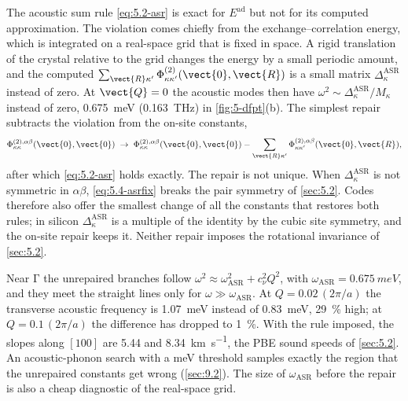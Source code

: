 The acoustic sum rule \cref{eq:5.2-asr} is exact for $E^{\mathrm{ad}}$ but not for its computed approximation. The violation comes chiefly from the exchange--correlation energy, which is integrated on a real-space grid that is fixed in space. A rigid translation of the crystal relative to the grid changes the energy by a small periodic amount, and the computed $\sum_{\vect{R}\kappa'}\Phi^{(2)}_{\kappa\kappa'}(\vect{0},\vect{R})$ is a small matrix $\Delta^{\mathrm{ASR}}_\kappa$ instead of zero. At $\vect{Q} = 0$ the acoustic modes then have $\omega^2 \sim \Delta^{\mathrm{ASR}}_\kappa/M_\kappa$ instead of zero, \SI{0.675}{meV} (\SI{0.163}{THz}) in \cref{fig:5-dfpt}(b). The simplest repair subtracts the violation from the on-site constants,
\begin{equation}
  \Phi^{(2),\alpha\beta}_{\kappa\kappa}(\vect{0},\vect{0}) \;\to\; \Phi^{(2),\alpha\beta}_{\kappa\kappa}(\vect{0},\vect{0}) - \sum_{\vect{R}\kappa'}\Phi^{(2),\alpha\beta}_{\kappa\kappa'}(\vect{0},\vect{R}) ,
  \label{eq:5.4-asrfix}
\end{equation}
after which \cref{eq:5.2-asr} holds exactly. The repair is not unique. When $\Delta^{\mathrm{ASR}}_\kappa$ is not symmetric in $\alpha\beta$, \cref{eq:5.4-asrfix} breaks the pair symmetry of \cref{sec:5.2}. Codes therefore also offer the smallest change of all the constants that restores both rules; in silicon $\Delta^{\mathrm{ASR}}_\kappa$ is a multiple of the identity by the cubic site symmetry, and the on-site repair keeps it. Neither repair imposes the rotational invariance of \cref{sec:5.2}.

Near $\mathrm{\Gamma}$ the unrepaired branches follow $\omega^2 \approx \omega_{\mathrm{ASR}}^2 + c_\nu^2Q^2$, with $\omega_{\mathrm{ASR}} = \SI{0.675}{meV}$, and they meet the straight lines only for $\omega \gg \omega_{\mathrm{ASR}}$. At $Q = 0.02\,(2\pi/a)$ the transverse acoustic frequency is \SI{1.07}{meV} instead of \SI{0.83}{meV}, \SI{29}{\percent} high; at $Q = 0.1\,(2\pi/a)$ the difference has dropped to \SI{1}{\percent}. With the rule imposed, the slopes along $[100]$ are 5.44 and \SI{8.34}{km.s^{-1}}, the PBE sound speeds of \cref{sec:5.2}. An acoustic-phonon search with a meV threshold samples exactly the region that the unrepaired constants get wrong (\cref{sec:9.2}). The size of $\omega_{\mathrm{ASR}}$ before the repair is also a cheap diagnostic of the real-space grid.
